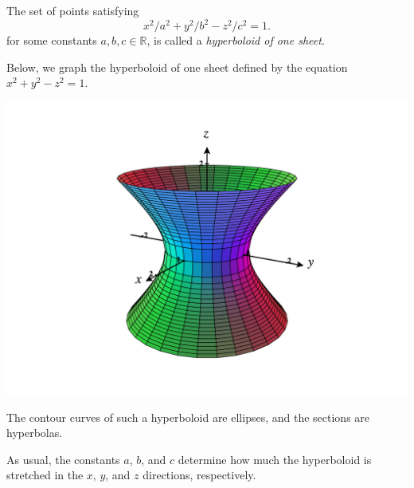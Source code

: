 \documentclass{ximera}
\begin{document}
\begin{example}
The set of points satisfying
\[
x^2/a^2 + y^2/b^2 - z^2/c^2 =1.
\]
for some constants $a,b,c\in\mathbb{R}$, is called a \emph{hyperboloid of one sheet}.

Below, we graph the hyperboloid of one sheet defined by the equation $x^2+y^2-z^2=1$.

\begin{image}
\includegraphics[width=\textwidth]{CalcPlot3D-hyperboloid1}
\end{image}

The contour curves of such a hyperboloid are ellipses, and the sections are hyperbolas.

As usual, the constants $a$, $b$, and $c$ determine how much the hyperboloid is stretched in the $x$, $y$, and $z$ directions, respectively. 
\end{example}
\end{document}

